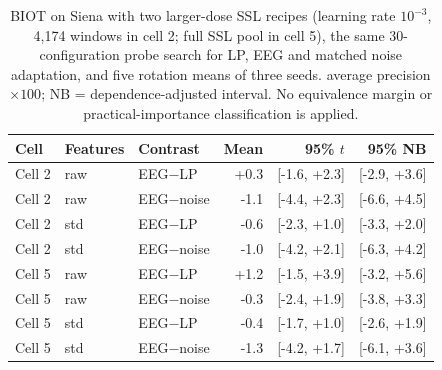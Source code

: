 \begin{table}[!htbp]
\caption{BIOT on Siena with two larger-dose SSL recipes (learning rate $10^{-3}$, 4,174 windows in cell 2; full SSL pool in cell 5), the same 30-configuration probe search for LP, EEG and matched noise adaptation, and five rotation means of three seeds. average precision $\times100$; NB = dependence-adjusted interval. No equivalence margin or practical-importance classification is applied.}
\label{tab:d32-avg_precision}
\centering\footnotesize
\setlength{\tabcolsep}{3pt}
\begin{tabular}{lllrrr}
\toprule
Cell & Features & Contrast & Mean & 95\% $t$ & 95\% NB\\
\midrule
Cell 2 & raw & EEG$-$LP & +0.3 & [-1.6, +2.3] & [-2.9, +3.6]\\
Cell 2 & raw & EEG$-$noise & -1.1 & [-4.4, +2.3] & [-6.6, +4.5]\\
Cell 2 & std & EEG$-$LP & -0.6 & [-2.3, +1.0] & [-3.3, +2.0]\\
Cell 2 & std & EEG$-$noise & -1.0 & [-4.2, +2.1] & [-6.3, +4.2]\\
Cell 5 & raw & EEG$-$LP & +1.2 & [-1.5, +3.9] & [-3.2, +5.6]\\
Cell 5 & raw & EEG$-$noise & -0.3 & [-2.4, +1.9] & [-3.8, +3.3]\\
Cell 5 & std & EEG$-$LP & -0.4 & [-1.7, +1.0] & [-2.6, +1.9]\\
Cell 5 & std & EEG$-$noise & -1.3 & [-4.2, +1.7] & [-6.1, +3.6]\\
\bottomrule
\end{tabular}
\end{table}
